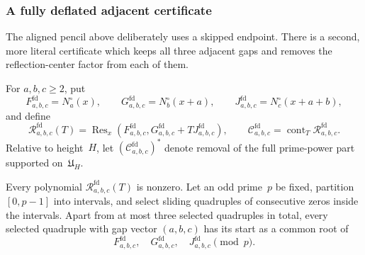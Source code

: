 \subsubsection{A fully deflated adjacent certificate}

The aligned pencil above deliberately uses a skipped endpoint.  There is a
second, more literal certificate which keeps all three adjacent gaps and
removes the reflection-center factor from each of them.

\begin{definition}
\label{def:qc-fd}
For $a,b,c\ge2$, put
\[
 F^{\mathrm{fd}}_{a,b,c}=N_a^\circ(x),\qquad
 G^{\mathrm{fd}}_{a,b,c}=N_b^\circ(x+a),\qquad
 J^{\mathrm{fd}}_{a,b,c}=N_c^\circ(x+a+b),
\]
and define
\[
 \mathcal R^{\mathrm{fd}}_{a,b,c}(T)
 =\operatorname{Res}_x\!\left(
 F^{\mathrm{fd}}_{a,b,c},
 G^{\mathrm{fd}}_{a,b,c}+T J^{\mathrm{fd}}_{a,b,c}
 \right),
 \qquad
 \mathcal C^{\mathrm{fd}}_{a,b,c}
 =\operatorname{cont}_T\mathcal R^{\mathrm{fd}}_{a,b,c}.
\]
Relative to height~$H$, let
$(\mathcal C^{\mathrm{fd}}_{a,b,c})^*$ denote removal of the full
prime-power part supported on~$\mathfrak U_H$.
\end{definition}

\begin{lemma}
\label{lem:qc-fd}
Every polynomial $\mathcal R^{\mathrm{fd}}_{a,b,c}(T)$ is nonzero.
Let an odd prime~$p$ be fixed, partition $[0,p-1]$ into intervals,
and select sliding quadruples of consecutive zeros inside the intervals.
Apart from at most three selected quadruples in total, every selected
quadruple with gap vector $(a,b,c)$ has its start as a common root of
\[
 F^{\mathrm{fd}}_{a,b,c},\quad
 G^{\mathrm{fd}}_{a,b,c},\quad
 J^{\mathrm{fd}}_{a,b,c}\pmod p.
\]
\end{lemma}


